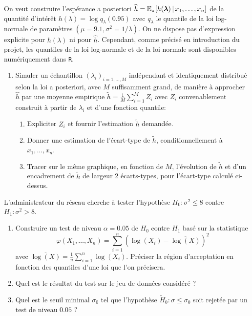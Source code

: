 \documentclass[11pt,a4paper,oneside]{article}
\newcommand{\blambda}{\boldsymbol{\lambda}}
\begin{document}
\begin{exercice}
\begin{enumerate}[resume]
\end{enumerate}
On veut construire l'espérance a posteriori $ \hat h  = \esp_{\pi}[h(\blambda) \,|\, x_1,\ldots, x_n]$ de la quantité d'intérêt
  $h(\lambda) = \log q_\lambda(0.95)$ avec $q_\lambda$ le quantile de la loi log-normale de paramètres $(\mu=9.1, \sigma^2 = 1/\lambda)$. On ne dispose   pas d'expression explicite pour $h(\lambda)$ ni pour $\hat h$. Cependant, comme précisé en introduction du projet, les quantiles de la loi log-normale et de la loi normale sont disponibles numériquement dans \texttt{R}. %
\begin{enumerate}[resume]%
\item 
  Simuler un échantillon $(\lambda_i)_{i = 1,\ldots, M}$
  indépendant et identiquement distribué selon la loi a posteriori,
  avec $M$ suffisamment grand, de manière à approcher $\hat h$ par une
  moyenne empirique $\tilde h = \frac{1}{M} \sum_{i=1}^M Z_i$ avec $Z_i$ convenablement construit à partir de $\lambda_i$ et d'une fonction quantile:
  \begin{enumerate}
  \item Expliciter $Z_i$ et fournir l'estimation $\tilde h$ demandée.
\item  Donner une estimation de l'écart-type
  de $\tilde h$, conditionnellement à $x_1, \ldots, x_n$.
\item Tracer sur le même graphique, en fonction de $M$, l'évolution de $\tilde h$ et
  d'un encadrement de $\tilde h$ de largeur 2 écarts-types, pour l'écart-type calculé ci-dessus. 
  \end{enumerate}
  
\end{enumerate} 
\end{exercice} 



\begin{exercice}
  L'administrateur du réseau cherche à tester l'hypothèse
  $H_0: \sigma^2 \le 8$ contre $H_1: \sigma^2>8$. 
  \begin{enumerate}
  \item Construire un  test de niveau $\alpha=0.05$ de $H_0$ contre $H_1$ basé sur la statistique
    \[
      \varphi(X_1,\ldots, X_n)  = \sum_{i=1}^n (\log(X_i) - \overline{\log(X)})^2
    \]
    avec $\overline{\log(X)} = \frac{1}{n}\sum_{i=1}^n \log(X_i)$.  Préciser la région d'acceptation en fonction des quantiles d'une loi que l'on précisera. 
  \item Quel est le résultat du test sur le jeu de données considéré ?
    \item Quel est le seuil minimal $\sigma_0$ tel que l'hypothèse $\tilde H_0: \sigma \le \sigma_0$ soit rejetée par un test de niveau $0.05$ ?
  \end{enumerate}
\end{exercice}
\end{document}
